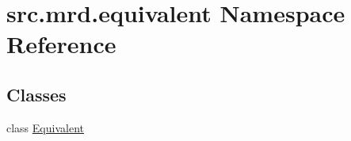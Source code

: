 \hypertarget{namespacesrc_1_1mrd_1_1equivalent}{\section{src.\+mrd.\+equivalent Namespace Reference}
\label{namespacesrc_1_1mrd_1_1equivalent}
}
\subsection*{Classes}
\begin{DoxyCompactItemize}
\item 
class \hyperlink{classsrc_1_1mrd_1_1equivalent_1_1_equivalent}{Equivalent}
\end{DoxyCompactItemize}
